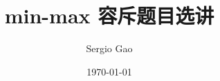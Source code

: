 \documentclass{beamer}
\title{min-max 容斥题目选讲}
\author{Sergio Gao}
\date{\today}
\begin{document}
\begin{frame}
  \titlepage
\end{frame}




\end{document}

